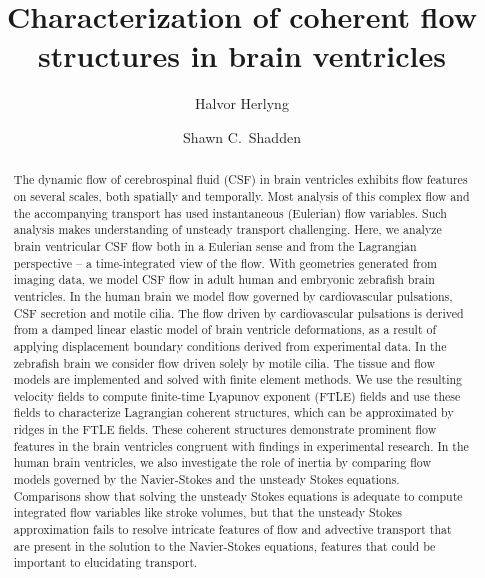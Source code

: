 \documentclass{template}
\title{\textbf{Characterization of coherent flow structures in brain ventricles}}
\author[1,*,\textdagger]{Halvor Herlyng}
\author[2]{Shawn C.~Shadden}
\affil[1]{Department of Numerical Analysis and Scientific Computing, Simula Research Laboratory, Oslo, Norway}
\affil[2]{Department of Mechanical Engineering, University of California, 6149 Etcheverry Hall, CA 94720-1740 Berkeley, USA}
\affil[*]{Corresponding author}
\date{\vspace{-2em}} %
\begin{document}
\maketitle

\begin{abstract}
    The dynamic flow of cerebrospinal fluid (CSF) in brain ventricles 
    exhibits flow features on several scales, both spatially and temporally.
    Most analysis of this complex flow and the accompanying transport
    has used instantaneous (Eulerian) flow variables. Such analysis
    makes understanding of unsteady transport challenging.
    Here, we analyze brain ventricular CSF flow both in a Eulerian
    sense and from the Lagrangian perspective -- a time-integrated view of the flow.
    With geometries generated from imaging data, we model CSF flow
    in adult human and embryonic zebrafish brain ventricles. 
    In the human brain we model flow governed by cardiovascular pulsations,
    CSF secretion and motile cilia. 
    The flow driven by cardiovascular pulsations is derived from a damped linear elastic model
    of brain ventricle deformations, as a result of applying displacement boundary
    conditions derived from experimental data.
    In the zebrafish brain we consider flow driven solely by motile cilia.
    The tissue and flow models are implemented and solved with finite element methods.
    We use the resulting velocity fields to compute finite-time Lyapunov exponent (FTLE)
    fields and use these fields to characterize Lagrangian coherent structures,
    which can be approximated by ridges in the FTLE fields.
    These coherent structures demonstrate prominent flow features in the brain ventricles
    congruent with findings in experimental research. In the human brain ventricles, we also 
    investigate the role of inertia by comparing flow models governed by 
    the Navier-Stokes and the unsteady Stokes equations. Comparisons show that
    solving the unsteady Stokes equations is adequate to compute integrated flow
    variables like stroke volumes, but that the unsteady Stokes approximation fails 
    to resolve intricate features of flow and advective transport that
    are present in the solution to the Navier-Stokes equations,
    features that could be important to elucidating transport.
\end{abstract}

\begingroup
  \renewcommand{\thefootnote}{\textdagger}
\endgroup
\end{document}
